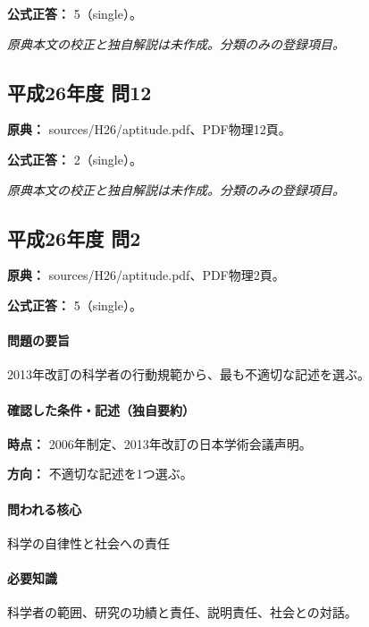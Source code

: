 \textbf{公式正答：} 5（single）。

\par\textit{原典本文の校正と独自解説は未作成。分類のみの登録項目。}

\subsection{平成26年度 問12}
\label{q:h26-reg-apt-12}

\noindent\textbf{原典：} sources/H26/aptitude.pdf、PDF物理12頁。

\textbf{公式正答：} 2（single）。

\par\textit{原典本文の校正と独自解説は未作成。分類のみの登録項目。}

\subsection{平成26年度 問2}
\label{q:h26-reg-apt-02}

\noindent\textbf{原典：} sources/H26/aptitude.pdf、PDF物理2頁。

\textbf{公式正答：} 5（single）。

\paragraph{問題の要旨} 2013年改訂の科学者の行動規範から、最も不適切な記述を選ぶ。

\paragraph{確認した条件・記述（独自要約）}\mbox{}\par

\noindent\textbf{時点：} 2006年制定、2013年改訂の日本学術会議声明。\par

\noindent\textbf{方向：} 不適切な記述を1つ選ぶ。\par

\paragraph{問われる核心} 科学の自律性と社会への責任

\paragraph{必要知識} 科学者の範囲、研究の功績と責任、説明責任、社会との対話。

